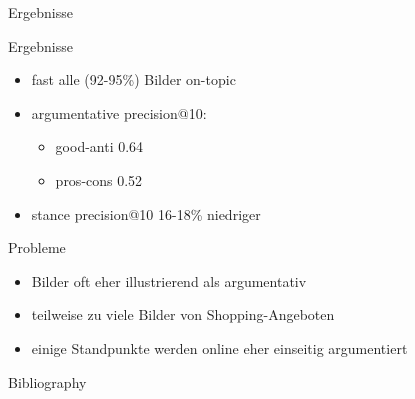 \documentclass{beamer}
\begin{document}
	\begin{section}{Ergebnisse}
		\begin{frame}{Ergebnisse}
			\begin{itemize}
				\item fast alle (92-95\%) Bilder on-topic
				\item argumentative precision@10: \begin{itemize}
					\item good-anti 0.64
					\item pros-cons 0.52
				\end{itemize}
				\item stance precision@10 16-18\% niedriger
			\end{itemize}
		\end{frame}
	
	\begin{frame}{Probleme}
		\begin{itemize}
			\item Bilder oft eher illustrierend als argumentativ
			\item teilweise zu viele Bilder von Shopping-Angeboten
			\item einige Standpunkte werden online eher einseitig argumentiert
		\end{itemize}
	\end{frame}
	\end{section}
	
	\begin{frame}[allowframebreaks]{Bibliography}
		
		
	\end{frame}
	
\end{document}
